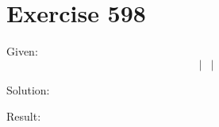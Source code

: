 \documentclass[a4paper, 10pt]{scrartcl}
\begin{document}
\section{Exercise 598}

Given:
\[
\left|
    \begin{array}{ccc}
    \end{array}
\right|
\]

Solution:

Result:
\end{document}
